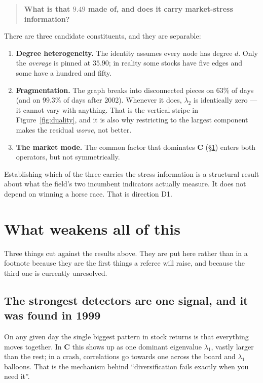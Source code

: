 \documentclass[11pt,a4paper]{article}
\newcommand{\Cmat}{\mathbf{C}}
\begin{document}
\begin{quote}
\textbf{What is that $9.49$ made of, and does it carry market-stress
information?}
\end{quote}

There are three candidate constituents, and they are separable:

\begin{enumerate}
\item \textbf{Degree heterogeneity.} The identity assumes every node has degree
$d$. Only the \emph{average} is pinned at $35.90$; in reality some stocks have
five edges and some have a hundred and fifty.
\item \textbf{Fragmentation.} The graph breaks into disconnected pieces on
$63\%$ of days (and on $99.3\%$ of days after 2002). Whenever it does,
$\lambda_2$ is identically zero --- it cannot vary with anything. That is the
vertical stripe in Figure~\ref{fig:duality}, and it is also why restricting to
the largest component makes the residual \emph{worse}, not better.
\item \textbf{The market mode.} The common factor that dominates $\Cmat$
(\S\ref{sec:caveats}) enters both operators, but not symmetrically.
\end{enumerate}

Establishing which of the three carries the stress information is a structural
result about what the field's two incumbent indicators actually measure. It does
not depend on winning a horse race. That is direction D1.

\section{What weakens all of this}
\label{sec:caveats}

Three things cut against the results above. They are put here rather than in a
footnote because they are the first things a referee will raise, and because the
third one is currently unresolved.

\subsection{The strongest detectors are one signal, and it was found in 1999}

On any given day the single biggest pattern in stock returns is that everything
moves together. In $\Cmat$ this shows up as one dominant eigenvalue $\lambda_1$,
vastly larger than the rest; in a crash, correlations go towards one across the
board and $\lambda_1$ balloons. That is the mechanism behind ``diversification
fails exactly when you need it''.
\end{document}
